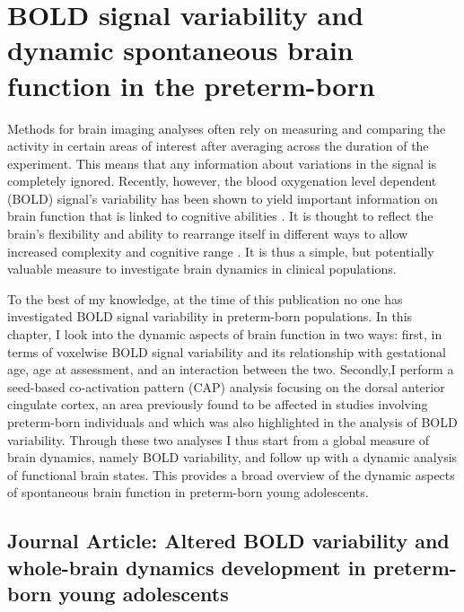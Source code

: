 \chapter{BOLD signal variability and dynamic spontaneous brain function in the preterm-born}\label{chapter:ch3}

\vspace{2cm}
Methods for brain imaging analyses often rely on measuring and comparing the activity in certain areas of interest after averaging across the duration of the experiment. This means that any information about variations in the signal is completely ignored. Recently, however, the blood oxygenation level dependent (BOLD) signal's variability has been shown to yield important information on brain function that is linked to cognitive abilities \citep{Garrett2013b}. It is thought to reflect the brain's flexibility and ability to rearrange itself in different ways to allow increased complexity and cognitive range \citep{Deco2011, McIntosh2010}. It is thus a simple, but potentially valuable measure to investigate brain dynamics in clinical populations.

To the best of my knowledge, at the time of this publication no one has investigated BOLD signal variability in preterm-born populations. In this chapter, I look into the dynamic aspects of brain function in two ways: first, in terms of voxelwise BOLD signal variability and its relationship with gestational age, age at assessment, and an interaction between the two. Secondly,I perform a seed-based co-activation pattern (CAP) analysis focusing on the dorsal anterior cingulate cortex, an area previously found to be affected in studies involving preterm-born individuals \citep{White2014,Daamen2015,Lordier2019} and which was also highlighted in the analysis of BOLD variability. Through these two analyses I thus start from a global measure of brain dynamics, namely BOLD variability, and follow up with a dynamic analysis of functional brain states. This provides a broad overview of the dynamic aspects of spontaneous brain function in preterm-born young adolescents.



\clearpage

\section{Journal Article: Altered BOLD variability and whole-brain dynamics development in preterm-born young adolescents} \label{section:ch3_BOLDvar_paper}

